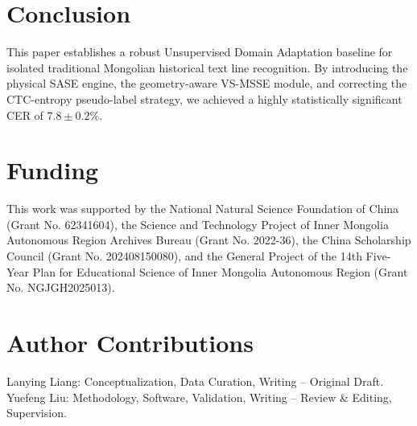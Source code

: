 \documentclass[pdflatex,sn-mathphys-num]{sn-jnl}
\begin{document}
\section{Conclusion}
This paper establishes a robust Unsupervised Domain Adaptation baseline for isolated traditional Mongolian historical text line recognition. By introducing the physical SASE engine, the geometry-aware VS-MSSE module, and correcting the CTC-entropy pseudo-label strategy, we achieved a highly statistically significant CER of $7.8 \pm 0.2\%$.

\section*{Funding}
This work was supported by the National Natural Science Foundation of China (Grant No. 62341604), the Science and Technology Project of Inner Mongolia Autonomous Region Archives Bureau (Grant No. 2022-36), the China Scholarship Council (Grant No. 202408150080), and the General Project of the 14th Five-Year Plan for Educational Science of Inner Mongolia Autonomous Region (Grant No. NGJGH2025013).

\section*{Author Contributions}
Lanying Liang: Conceptualization, Data Curation, Writing -- Original Draft. Yuefeng Liu: Methodology, Software, Validation, Writing -- Review \& Editing, Supervision.
\end{document}
